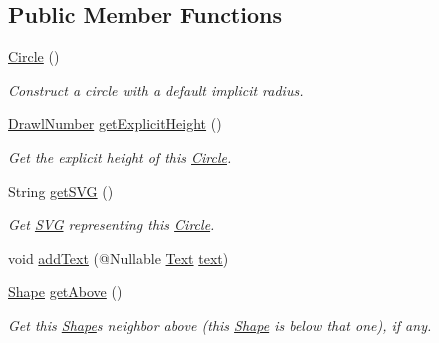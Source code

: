 \subsection*{Public Member Functions}
\begin{DoxyCompactItemize}
\item 
\hyperlink{classcom_1_1aarrelaakso_1_1drawl_1_1_circle_a18cd01a953d72d49941bc8211f50d268}{Circle} ()
\begin{DoxyCompactList}\small\item\em Construct a circle with a default implicit radius. \end{DoxyCompactList}\item 
\hyperlink{classcom_1_1aarrelaakso_1_1drawl_1_1_drawl_number}{Drawl\+Number} \hyperlink{classcom_1_1aarrelaakso_1_1drawl_1_1_circle_a7754ee3923393a342e734a91bd094d25}{get\+Explicit\+Height} ()
\begin{DoxyCompactList}\small\item\em Get the explicit height of this \hyperlink{classcom_1_1aarrelaakso_1_1drawl_1_1_circle}{Circle}. \end{DoxyCompactList}\item 
String \hyperlink{classcom_1_1aarrelaakso_1_1drawl_1_1_circle_adc826cc2d93eb4e78318035c86d00f03}{get\+S\+VG} ()
\begin{DoxyCompactList}\small\item\em Get \hyperlink{classcom_1_1aarrelaakso_1_1drawl_1_1_s_v_g}{S\+VG} representing this \hyperlink{classcom_1_1aarrelaakso_1_1drawl_1_1_circle}{Circle}. \end{DoxyCompactList}\item 
void \hyperlink{classcom_1_1aarrelaakso_1_1drawl_1_1_shape_a9784264f6abcf623b2774d6ef2a53fdc}{add\+Text} (@Nullable \hyperlink{classcom_1_1aarrelaakso_1_1drawl_1_1_text}{Text} \hyperlink{classcom_1_1aarrelaakso_1_1drawl_1_1_shape_ab54afc2d95d3447532f5ecf3fec3faa8}{text})
\item 
\hyperlink{classcom_1_1aarrelaakso_1_1drawl_1_1_shape}{Shape} \hyperlink{classcom_1_1aarrelaakso_1_1drawl_1_1_shape_acebea2aa57031322323c9bf50ee447db}{get\+Above} ()
\begin{DoxyCompactList}\small\item\em Get this \hyperlink{classcom_1_1aarrelaakso_1_1drawl_1_1_shape}{Shape}\textquotesingle{}s neighbor above (this \hyperlink{classcom_1_1aarrelaakso_1_1drawl_1_1_shape}{Shape} is below that one), if any. \end{DoxyCompactList}\item 

\end{DoxyCompactItemize}

